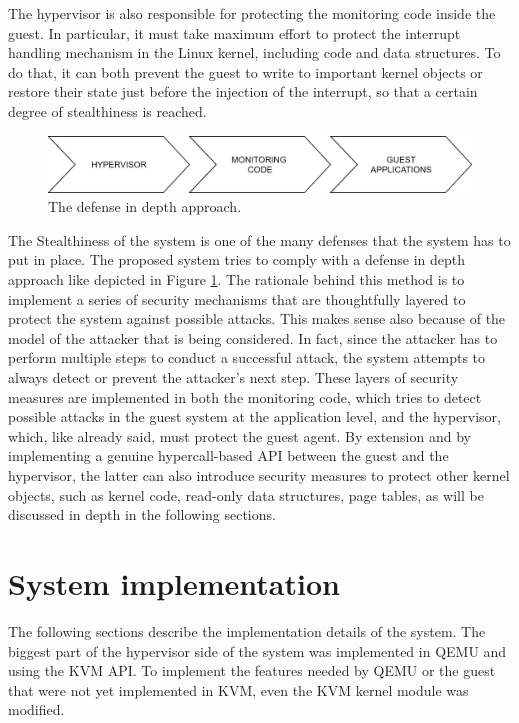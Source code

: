 \par
The hypervisor is also responsible for protecting the monitoring code inside the guest. In particular, it must take maximum effort to protect the interrupt handling mechanism in the Linux kernel, including code and data structures. To do that, it can both prevent the guest to write to important kernel objects or restore their state just before the injection of the interrupt, so that a certain degree of stealthiness is reached.
\begin{figure}[t]
    \centering
    \includegraphics[width=\textwidth]{images/defense-in-depth.png}
    \caption{The defense in depth approach.}
    \label{fig:defense-in-depth}
\end{figure}
\par
The Stealthiness of the system is one of the many defenses that the system has to put in place. The proposed system tries to comply with a defense in depth approach like depicted in Figure \ref{fig:defense-in-depth}. The rationale behind this method is to implement a series of security mechanisms that are thoughtfully layered to protect the system against possible attacks. This makes sense also because of the model of the attacker that is being considered. In fact, since the attacker has to perform multiple steps to conduct a successful attack, the system attempts to always detect or prevent the attacker's next step. These layers of security measures are implemented in both the monitoring code, which tries to detect possible attacks in the guest system at the application level, and the hypervisor, which, like already said, must protect the guest agent. By extension and by implementing a genuine hypercall-based API between the guest and the hypervisor, the latter can also introduce security measures to protect other kernel objects, such as kernel code, read-only data structures, page tables, as will be discussed in depth in the following sections. 

\section{System implementation}
The following sections describe the implementation details of the system. The biggest part of the hypervisor side of the system was implemented in QEMU and using the KVM API. To implement the features needed by QEMU or the guest that were not yet implemented in KVM, even the KVM kernel module was modified.

